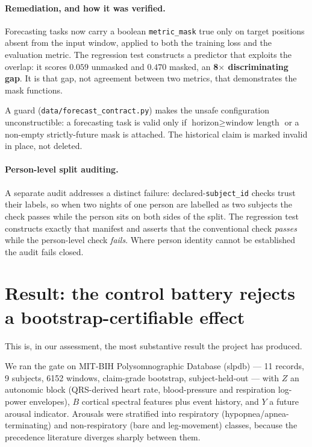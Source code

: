 \documentclass[11pt]{article}
\begin{document}
\paragraph{Remediation, and how it was verified.} Forecasting tasks now carry a
boolean \texttt{metric\_mask} true only on target positions absent from the input
window, applied to both the training loss and the evaluation metric. The
regression test constructs a predictor that exploits the overlap: it scores
$0.059$ unmasked and $0.470$ masked, an \textbf{8$\times$ discriminating gap}. It
is that gap, not agreement between two metrics, that demonstrates the mask
functions.

A guard (\texttt{data/forecast\_contract.py}) makes the unsafe configuration
unconstructible: a forecasting task is valid only if
$\text{horizon} \geq \text{window length}$ or a non-empty strictly-future mask is
attached. The historical claim is marked invalid in place, not deleted.

\paragraph{Person-level split auditing.} A separate audit addresses a distinct
failure: declared-\texttt{subject\_id} checks trust their labels, so when two
nights of one person are labelled as two subjects the check passes while the
person sits on both sides of the split. The regression test constructs exactly
that manifest and asserts that the conventional check \emph{passes} while the
person-level check \emph{fails}. Where person identity cannot be established the
audit fails closed.

\section{Result: the control battery rejects a bootstrap-certifiable effect}
\label{sec:caught}

This is, in our assessment, the most substantive result the project has produced.

We ran the gate on MIT-BIH Polysomnographic Database (slpdb) --- 11 records,
9 subjects, 6152 windows, claim-grade bootstrap, subject-held-out --- with
$Z$ an autonomic block (QRS-derived heart rate, blood-pressure and respiration
log-power envelopes), $B$ cortical spectral features plus event history, and
$Y$ a future arousal indicator. Arousals were stratified into respiratory
(hypopnea/apnea-terminating) and non-respiratory (bare and leg-movement) classes,
because the precedence literature diverges sharply between them.
\end{document}
